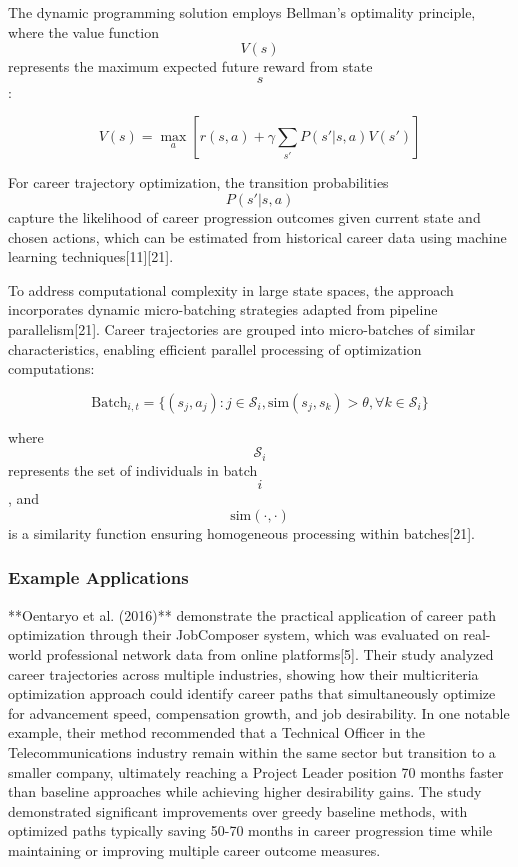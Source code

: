 \documentclass[main.tex]{subfiles}
\begin{document}
The dynamic programming solution employs Bellman's optimality principle, where the value function $$V(s)$$ represents the maximum expected future reward from state $$s$$:

$$
V(s) = \max_a \left[r(s,a) + \gamma \sum_{s'} P(s'|s,a) V(s')\right]
$$

For career trajectory optimization, the transition probabilities $$P(s'|s,a)$$ capture the likelihood of career progression outcomes given current state and chosen actions, which can be estimated from historical career data using machine learning techniques[11][21].

To address computational complexity in large state spaces, the approach incorporates dynamic micro-batching strategies adapted from pipeline parallelism[21]. Career trajectories are grouped into micro-batches of similar characteristics, enabling efficient parallel processing of optimization computations:

$$
\text{Batch}_{i,t} = \{(s_j, a_j) : j \in \mathcal{S}_i, \text{sim}(s_j, s_k) > \theta, \forall k \in \mathcal{S}_i\}
$$

where $$\mathcal{S}_i$$ represents the set of individuals in batch $$i$$, and $$\text{sim}(\cdot, \cdot)$$ is a similarity function ensuring homogeneous processing within batches[21].

\subsubsection{Example Applications}

**Oentaryo et al. (2016)** demonstrate the practical application of career path optimization through their JobComposer system, which was evaluated on real-world professional network data from online platforms[5]. Their study analyzed career trajectories across multiple industries, showing how their multicriteria optimization approach could identify career paths that simultaneously optimize for advancement speed, compensation growth, and job desirability. In one notable example, their method recommended that a Technical Officer in the Telecommunications industry remain within the same sector but transition to a smaller company, ultimately reaching a Project Leader position 70 months faster than baseline approaches while achieving higher desirability gains. The study demonstrated significant improvements over greedy baseline methods, with optimized paths typically saving 50-70 months in career progression time while maintaining or improving multiple career outcome measures.
\end{document}
